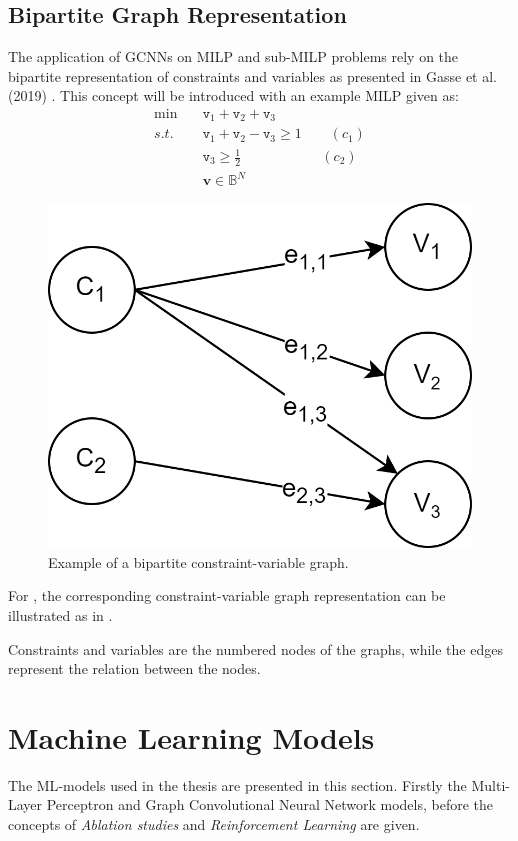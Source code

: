 \subsection{Bipartite Graph Representation}

The application of \gls{GCNN}s on \gls{MILP} and sub-\gls{MILP} problems rely on the bipartite representation of constraints and variables as presented in Gasse et al. (2019) \cite{gasse2019exact}.
This concept will be introduced with an example \gls{MILP} given as:
\begin{align}\label{eq:bipex}
    \min \quad &\texttt{v}_1 + \texttt{v}_2 + \texttt{v}_3\\ 
    s.t. \quad &\texttt{v}_1 + \texttt{v}_2 - \texttt{v}_3 \geq 1 \qquad (c_1)\nonumber\\
    &\texttt{v}_3 \geq \frac{1}{2}\qquad\qquad\quad\;\,\; (c_2)\nonumber\\
    &\mathbf{v} \in \mathbb{B}^N \nonumber
\end{align}

\begin{figure}
    \centering
    \includegraphics[width=0.40\linewidth]{img/bipartite_zoom.png}
    \caption{Example of a bipartite constraint-variable graph.}
    \label{fig:bipartite_cv}
\end{figure}

For , the corresponding constraint-variable graph representation can be illustrated as in
.

Constraints and variables are the numbered nodes of the graphs, while the edges represent the relation between the nodes. 



\section{Machine Learning Models}\label{sec:back_models}


The \gls{ML}-models used in the thesis are presented in this section. Firstly the Multi-Layer Perceptron and Graph Convolutional Neural Network models, before the concepts of \textit{Ablation studies} and \textit{Reinforcement Learning} are given.

